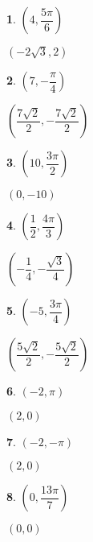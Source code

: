 \documentclass{amsbook}
\newtheorem{exc}{}
\newenvironment{ex}{\begin{exc}\normalfont}{\end{exc}}
\numberwithin{section}{chapter}
\numberwithin{equation}{chapter}
\begin{document}
\begin{multicols}{3}

\begin{ex}
	$\left( 4, \dfrac{5\pi}{6} \right)$
	\begin{sol}
		$\left( -2\sqrt{3},2 \right)$
	\end{sol}
\end{ex}

\begin{ex}
		$\left( 7, -\dfrac{\pi}{4} \right)$
	\begin{sol}
			$\left( \dfrac{7\sqrt{2}}{2}, -\dfrac{7\sqrt{2}}{2} \right)$
	\end{sol}
\end{ex}

\begin{ex}
	$\left( 10, \dfrac{3\pi}{2} \right)$
	\begin{sol}
		$(0,-10)$
	\end{sol}
\end{ex}


\begin{ex}
	$\left( \dfrac{1}{2}, \dfrac{4\pi}{3}\right)$
	\begin{sol}
		$\left(- \dfrac{1}{4}, -\dfrac{\sqrt{3}}{4} \right)$
	\end{sol}
\end{ex}

\begin{ex}
		$\left( -5, \dfrac{3\pi}{4} \right)$
	\begin{sol}
		$\left( \dfrac{5\sqrt{2}}{2}, -\dfrac{5\sqrt{2}}{2} \right)$
	\end{sol}
\end{ex}

\begin{ex}
	$\left( -2, \pi \right)$
	\begin{sol}
		$(2,0)$
	\end{sol}
\end{ex}


\begin{ex}
	$\left( -2, -\pi \right)$
	\begin{sol}
		$(2,0)$
	\end{sol}
\end{ex}


\begin{ex}
		$\left( 0,  \dfrac{13\pi}{7} \right)$
	\begin{sol}
		$(0,0)$
	\end{sol}
\end{ex}

\end{multicols}
\end{document}
